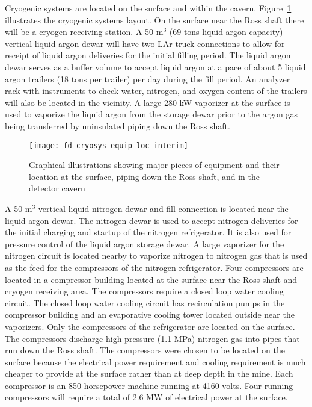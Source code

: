 Cryogenic systems are located on the surface and within the cavern. Figure~\ref{fig:eqp-at-surface}  illustrates the cryogenic systems layout. On the surface near the Ross shaft there will be a
cryogen receiving station. A 50-m$^3$
(69 tons liquid argon capacity) vertical liquid argon dewar
will have two LAr truck connections to allow for receipt of liquid argon deliveries for
the initial
filling period. The liquid argon dewar serves as a buffer volume to accept liquid argon at a pace
of about 5 liquid argon trailers (18 tons per trailer) per day during the fill period. An analyzer
rack with instruments to check water, nitrogen, and oxygen content of the trailers will also be
located in the vicinity. A large 280 kW vaporizer at the surface is used to vaporize the liquid
argon from the storage dewar prior to the argon gas being transferred by uninsulated piping
down the Ross shaft.

\begin{figure}[htbp]
\centering
\texttt{[image: fd-cryosys-equip-loc-interim]} 
\caption{Graphical illustrations showing major pieces of equipment and their location at the
surface, piping down the Ross shaft, and in the detector cavern}
\label{fig:eqp-at-surface}
\end{figure}


A 50-m$^3$ vertical liquid nitrogen dewar
and fill connection is located near the liquid argon dewar.
The nitrogen dewar is used to accept nitrogen deliveries for the initial charging and startup of
the nitrogen refrigerator. It is also used for pressure control of the liquid argon storage dewar.
A large vaporizer for the nitrogen circuit is located nearby to vaporize nitrogen to nitrogen gas
that is used as the feed for the compressors of the nitrogen refrigerator. Four compressors are
located in a compressor building located at the surface near the Ross shaft and cryogen
receiving area. The compressors require a closed loop water cooling circuit. The closed loop
water cooling circuit has recirculation pumps in the compressor building and an evaporative
cooling tower located outside near the
vaporizers. Only the compressors of the refrigerator are
located on the surface. The compressors discharge high pressure (1.1 MPa) nitrogen gas into
pipes that run down the Ross shaft. The compressors were chosen to be located on the surface
because the electrical power requirement and cooling requirement is much cheaper to provide
at the surface rather than at deep depth in the mine. Each compressor
is an 850 horsepower
machine running at 4160 volts. Four running compressors will require a total of
2.6 MW of electrical power at the surface.

